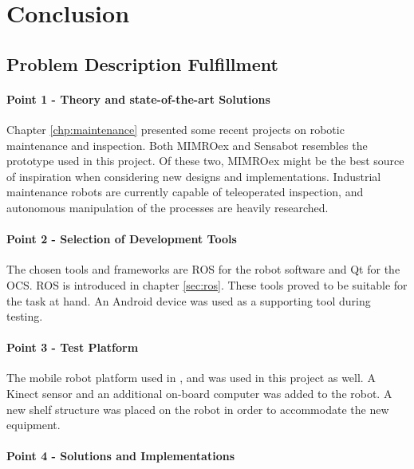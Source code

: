 \chapter{Conclusion}
\label{chp:conclusion} 

\section{Problem Description Fulfillment}

\subsubsection{Point 1 - Theory and state-of-the-art Solutions}

Chapter \ref{chp:maintenance} presented some recent projects on robotic maintenance and inspection. Both \ac{MIMROex} and Sensabot resembles the prototype used in this project. Of these two, \ac{MIMROex} might be the best source of inspiration when considering new designs and implementations. Industrial maintenance robots are currently capable of teleoperated inspection, and autonomous manipulation of the processes are heavily researched. 

\subsubsection{Point 2 - Selection of Development Tools}

The chosen tools and frameworks are \ac{ROS} for the robot software and Qt for the \ac{OCS}. \ac{ROS} is introduced in chapter \ref{sec:ros}. These tools proved to be suitable for the task at hand. An Android device was used as a supporting tool during testing.

\subsubsection{Point 3 - Test Platform}

The mobile robot platform used in \cite{aspunvik}, \cite{berg} and \cite{lindrup} was used in this project as well. A Kinect sensor and an additional on-board computer was added to the robot. A new shelf structure was placed on the robot in order to accommodate the new equipment. 

\subsubsection{Point 4 - Solutions and Implementations}


